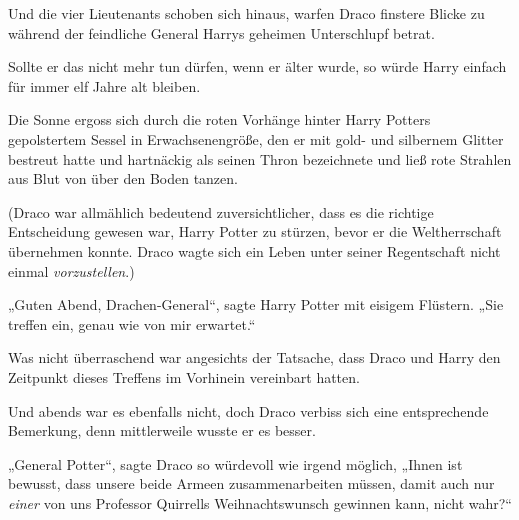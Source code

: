 Und die vier Lieutenants schoben sich hinaus, warfen Draco finstere Blicke zu während der feindliche General Harrys geheimen Unterschlupf betrat.

Sollte er das nicht mehr tun dürfen, wenn er älter wurde, so würde Harry einfach für immer elf Jahre alt bleiben.

\later

Die Sonne ergoss sich durch die roten Vorhänge hinter Harry Potters gepolstertem Sessel in Erwachsenengröße, den er mit gold- und silbernem Glitter bestreut hatte und hartnäckig als seinen Thron bezeichnete und ließ rote Strahlen aus Blut von über den Boden tanzen.

(Draco war allmählich bedeutend zuversichtlicher, dass es die richtige Entscheidung gewesen war, Harry Potter zu stürzen, bevor er die Weltherrschaft übernehmen konnte. Draco wagte sich ein Leben unter seiner Regentschaft nicht einmal \emph{vorzustellen}.)

„Guten Abend, Drachen-General“, sagte Harry Potter mit eisigem Flüstern. „Sie treffen ein, genau wie von mir erwartet.“

Was nicht überraschend war angesichts der Tatsache, dass Draco und Harry den Zeitpunkt dieses Treffens im Vorhinein vereinbart hatten.

Und abends war es ebenfalls nicht, doch Draco verbiss sich eine entsprechende Bemerkung, denn mittlerweile wusste er es besser.

„General Potter“, sagte Draco so würdevoll wie irgend möglich, „Ihnen ist bewusst, dass unsere beide Armeen zusammenarbeiten müssen, damit auch nur \emph{einer} von uns Professor Quirrells Weihnachtswunsch gewinnen kann, nicht wahr?“

